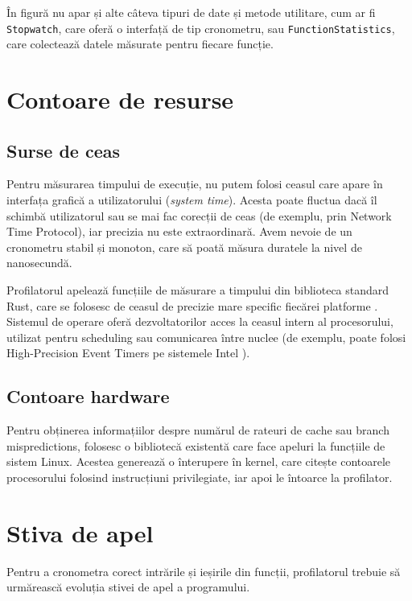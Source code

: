 În figură nu apar și alte câteva tipuri de date și metode utilitare, cum ar fi \texttt{Stopwatch}, care oferă o interfață de tip cronometru, sau \texttt{FunctionStatistics}, care colectează datele măsurate pentru fiecare funcție.

\section{Contoare de resurse}

\subsection{Surse de ceas}

Pentru măsurarea timpului de execuție, nu putem folosi ceasul care apare în interfața grafică a utilizatorului (\textit{system time}). Acesta poate fluctua dacă îl schimbă utilizatorul sau se mai fac corecții de ceas (de exemplu, prin Network Time Protocol), iar precizia nu este extraordinară. Avem nevoie de un cronometru stabil și monoton, care să poată măsura duratele la nivel de nanosecundă.

Profilatorul apelează funcțiile de măsurare a timpului din biblioteca standard Rust, care se folosesc de ceasul de precizie mare specific fiecărei platforme \cite{std_time_instant_docs}. Sistemul de operare oferă dezvoltatorilor acces la ceasul intern al procesorului, utilizat pentru scheduling sau comunicarea între nuclee (de exemplu, poate folosi High-Precision Event Timers pe sistemele Intel \cite{intel_hpet}).

\subsection{Contoare hardware}

Pentru obținerea informațiilor despre numărul de rateuri de cache sau branch mispredictions, folosesc o bibliotecă existentă care face apeluri la funcțiile de sistem Linux. Acestea generează o înterupere în kernel, care citește contoarele procesorului folosind instrucțiuni privilegiate, iar apoi le întoarce la profilator.

\section{Stiva de apel}

Pentru a cronometra corect intrările și ieșirile din funcții, profilatorul trebuie să urmărească evoluția stivei de apel a programului.

